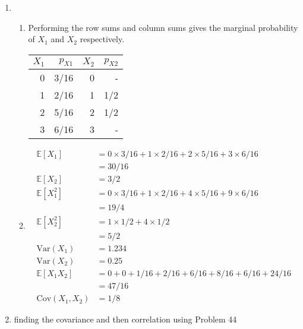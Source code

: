 \begin{enumerate}
	
	\item 
		\begin{enumerate}
			\item Performing the row sums and column sums gives the marginal probability of $ X_1 $ and $ X_2 $ respectively.
			
			\begin{table}[H]
				\centering
				\begin{tabular}{@{}rr|rr@{}}
					\toprule
					$ X_1 $ & $ p_{X1} $ & $ X_2 $ & $ p_{X2} $ \\ \midrule
					0     & 3/16	& 0	 & - 	 \\
					1     & 2/16    & 1	 & 1/2 	 \\
					2     & 5/16    & 2	 & 1/2 	 \\
					3     & 6/16    & 3	 & - 	 \\ \bottomrule
				\end{tabular}
			\end{table}
			
			\item \begin{align}
				\mathbb{E}[X_1] &= 0 \times 3/16 + 1 \times 2/16 + 2 \times 5/16 + 3 \times 6/16 \nonumber \\
				&= 30/16 \\
				\mathbb{E}[X_2] &= 3/2 \\
				\mathbb{E}[X_1^2] &= 0 \times 3/16 + 1 \times 2/16 + 4 \times 5/16 + 9 \times 6/16 \nonumber \\
				&= 19/4 \\
				\mathbb{E}[X_2^2] &= 1 \times 1/2 + 4 \times 1/2 \nonumber \\
				&= 5/2 \\
				\mathrm{Var}(X_1) &= 1.234 \\
				\mathrm{Var}(X_2) &= 0.25 \\
				\mathbb{E}[X_1 X_2] &= 0 + 0 + 1/16 + 2/16 + 6/16 + 8/16 + 6/16 + 24/16  \nonumber \\
				&= 47/16 \\
				\mathrm{Cov}(X_1, X_2) &= 1/8 
			\end{align}
		\end{enumerate}
	
	
	\item finding the covariance and then correlation using Problem 44 \\ 
	

\end{enumerate}
